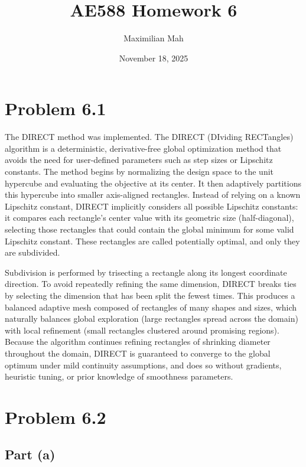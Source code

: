 \documentclass{article}
\title{AE588 Homework 6}
\author{Maximilian Mah}
\date{November 18, 2025}
\begin{document}
\onehalfspacing     %

\maketitle
\thispagestyle{empty}
\newpage

\section*{Problem 6.1}

The DIRECT method was implemented. The DIRECT (DIviding RECTangles) algorithm is a deterministic, derivative-free global optimization method that avoids the need for user-defined parameters such as step sizes or Lipschitz constants. The method begins by normalizing the design space to the unit hypercube and evaluating the objective at its center. It then adaptively partitions this hypercube into smaller axis-aligned rectangles. Instead of relying on a known Lipschitz constant, DIRECT implicitly considers all possible Lipschitz constants: it compares each rectangle’s center value with its geometric size (half-diagonal), selecting those rectangles that could contain the global minimum for some valid Lipschitz constant. These rectangles are called potentially optimal, and only they are subdivided.

Subdivision is performed by trisecting a rectangle along its longest coordinate direction. To avoid repeatedly refining the same dimension, DIRECT breaks ties by selecting the dimension that has been split the fewest times. This produces a balanced adaptive mesh composed of rectangles of many shapes and sizes, which naturally balances global exploration (large rectangles spread across the domain) with local refinement (small rectangles clustered around promising regions). Because the algorithm continues refining rectangles of shrinking diameter throughout the domain, DIRECT is guaranteed to converge to the global optimum under mild continuity assumptions, and does so without gradients, heuristic tuning, or prior knowledge of smoothness parameters.

\section*{Problem 6.2}
\subsection*{Part (a)}
\end{document}
